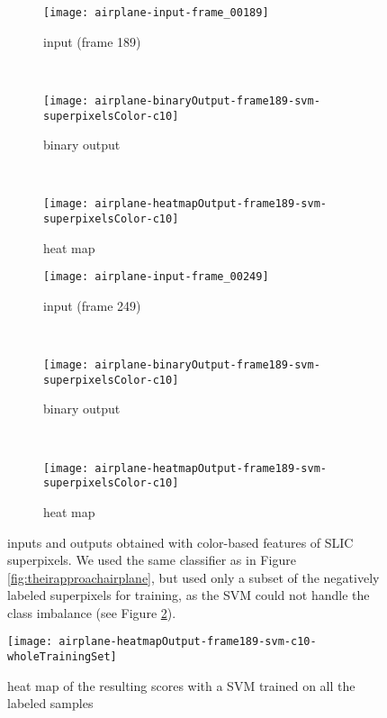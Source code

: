 \begin{figure}[ht]
	\centering
	\begin{subfigure}[h]{0.31\textwidth}
		\texttt{[image: airplane-input-frame\_00189]}
		\caption*{input (frame 189)}
	\end{subfigure}
	~
	\begin{subfigure}[h]{0.31\textwidth}
		\texttt{[image: airplane-binaryOutput-frame189-svm-superpixelsColor-c10]}	
		\caption*{binary output}
	\end{subfigure}
	~
	\begin{subfigure}[h]{0.31\textwidth}
		\texttt{[image: airplane-heatmapOutput-frame189-svm-superpixelsColor-c10]}	
		\caption*{heat map}
	\end{subfigure}
	
	\vspace{3mm}
	\begin{subfigure}[h]{0.31\textwidth}
		\texttt{[image: airplane-input-frame\_00249]}	
		\caption*{input (frame 249)}
	\end{subfigure}
	~
	\begin{subfigure}[h]{0.31\textwidth}
		\texttt{[image: airplane-binaryOutput-frame189-svm-superpixelsColor-c10]}	
		\caption*{binary output}
	\end{subfigure}	
	~
	\begin{subfigure}[h]{0.31\textwidth}
		\texttt{[image: airplane-heatmapOutput-frame189-svm-superpixelsColor-c10]}	
		\caption*{heat map}
	\end{subfigure}	
	\caption{inputs and outputs obtained with color-based features of SLIC superpixels. We used the same classifier as in Figure \ref{fig:theirapproachairplane}, but used only a subset of the negatively labeled superpixels for training, as the SVM could not handle the class imbalance (see Figure \ref{fig:airplaneSVMclassImbalance}). }
	\label{fig:airplaneSLIC}
\end{figure}

\begin{figure}[ht]
	\centering
	\texttt{[image: airplane-heatmapOutput-frame189-svm-c10-wholeTrainingSet]}
	\caption{heat map of the resulting scores with a SVM trained on all the labeled samples }
	\label{fig:airplaneSVMclassImbalance}
\end{figure}



